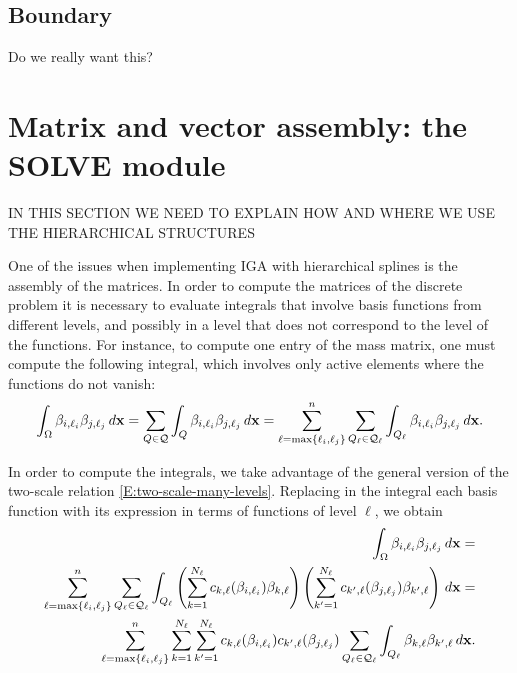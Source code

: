 \documentclass[a4paper]{siamltex1213}
\newcommand{\Rd}{\color{red}}
\newcommand\QQ{\mathcal Q}
\newcommand{\bx}{{\bf x}}
\begin{document}
\subsection{Boundary}

{\Rd Do we really want this?}

\section{Matrix and vector assembly: the SOLVE module} \label{sec:SOLVE}

{\Rd IN THIS SECTION WE NEED TO EXPLAIN HOW AND WHERE WE USE THE HIERARCHICAL STRUCTURES}

One of the issues when implementing IGA with hierarchical splines is the assembly of the matrices. In order to compute the matrices of the discrete problem it is necessary to evaluate integrals that involve basis functions from different levels, and possibly in a level that does not correspond to the level of the functions. For instance, to compute one entry of the mass matrix, one must compute the following integral, which involves only active elements where the functions do not vanish:
\begin{equation*}
\int_\Omega \beta_{i,\ell_i} \beta_{j,\ell_j} \, d\bx = \sum_{Q \in \QQ} \int_Q \beta_{i,\ell_i} \beta_{j,\ell_j} \, d\bx = \sum_{\ell = \max\{\ell_i, \ell_j\}}^n \sum_{Q_\ell \in \QQ_\ell} \int_{Q_\ell} \beta_{i,\ell_i} \beta_{j,\ell_j} \, d\bx.
\end{equation*}

In order to compute the integrals, we take advantage of the general version of the two-scale relation \eqref{E:two-scale-many-levels}. Replacing in the integral each basis function with its expression in terms of functions of level $\ell$, we obtain 
\begin{align*}
\int_\Omega \beta_{i,\ell_i} \beta_{j,\ell_j} \, d\bx = \\
\sum_{\ell = \max\{\ell_i, \ell_j\}}^n \sum_{Q_\ell \in \QQ_\ell}  \int_{Q_\ell} \left(\sum_{k=1}^{N_\ell} c_{k,\ell}(\beta_{i,\ell_i}) \beta_{k,\ell}\right) \left(\sum_{k'=1}^{N_\ell} c_{k',\ell}(\beta_{j,\ell_j}) \beta_{k',\ell}\right) \, d\bx = \\
\sum_{\ell = \max\{\ell_i, \ell_j\}}^n \sum_{k=1}^{N_\ell} \sum_{k'=1}^{N_\ell} c_{k,\ell}(\beta_{i,\ell_i}) c_{k',\ell}(\beta_{j,\ell_j}) \sum_{Q_\ell \in \QQ_\ell}  \int_{Q_\ell}  \beta_{k,\ell}  \beta_{k',\ell} \, d\bx.
\end{align*}
\end{document}
